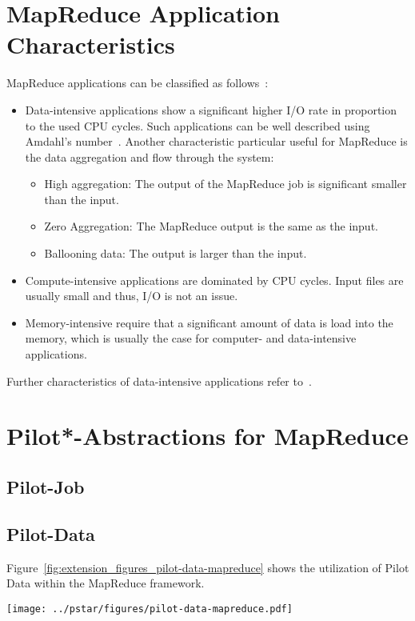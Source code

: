 \documentclass[conference,final]{IEEEtran}
\begin{document}
\section{MapReduce Application Characteristics}

MapReduce applications can be classified as follows~\cite{weissman2011,ramakrishnan2011}:
\begin{itemize}
    \item Data-intensive applications show a significant higher I/O rate in proportion to the used CPU cycles. Such applications can be well described using Amdahl's number~\cite{gray2000}. Another characteristic particular useful for MapReduce is the data aggregation and flow through the system:
        \begin{itemize}
            \item High aggregation: The output of the MapReduce job is significant smaller than the input.
            \item Zero Aggregation: The MapReduce output is the same as the 
            input.
            \item Ballooning data: The output is larger than the input.
        \end{itemize}
    \item Compute-intensive applications are dominated by CPU cycles. Input 
    files are usually small and thus, I/O is not an issue.
    \item Memory-intensive require that a significant amount of data is load
    into the memory, which is usually the case for computer- and data-intensive 
    applications.
\end{itemize}
Further characteristics of data-intensive applications refer to~\cite{jha2011}.



\section{Pilot*-Abstractions for MapReduce}

\subsection{Pilot-Job}

\subsection{Pilot-Data}
Figure~\ref{fig:extension_figures_pilot-data-mapreduce} shows the utilization of 
Pilot Data within the MapReduce framework.
\begin{figure*}[htbp]
	\centering
	\texttt{[image: ../pstar/figures/pilot-data-mapreduce.pdf]}
	\caption{Pilot-Data and MapReduce}
	\label{fig:extension_figures_pilot-data-mapreduce}
\end{figure*}
\end{document}
